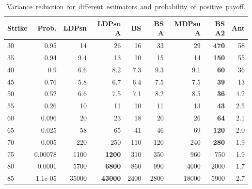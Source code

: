 \small{
\begin{table}[hbt!]
\centering
\begin{tabular}{lrrrrrrrr}
\toprule
Strike &   Prob. &  LDPsn &  LDPsn A &   BS &  BS A &  MDPsn A &  BS A2 &  Ant \\
\midrule
30 &    0.95 &     14 &       26 &   16 &    33 &           29  &    \textbf{470} &   58 \\
35 &    0.94 &    9.4 &       13 &   10 &    15 &           14  &    \textbf{150} &   55 \\
40 &     0.9 &    6.6 &      8.2 &  7.3 &   9.3 &          9.1  &     \textbf{60} &   36 \\
45 &    0.76 &    5.8 &      6.7 &  6.4 &   7.5 &          7.5  &     \textbf{39} &   13 \\
50 &    0.52 &    6.6 &      7.5 &  7.1 &   8.2 &          8.5  &     \textbf{36} &  4.2 \\
55 &    0.26 &     10 &       11 &   10 &    11 &           13  &     \textbf{43} &  2.5 \\
60 &   0.096 &     20 &       23 &   18 &    20 &           26  &     \textbf{64} &  2.1 \\
65 &   0.025 &     58 &       65 &   41 &    46 &           69  &    \textbf{120} &  2.0 \\
70 &   0.005 &    220 &      250 &  110 &   120 &          240  &    \textbf{280} &  1.9 \\
75 & 0.00078 &   1100 &     \textbf{1200} &  310 &   350 &          960 &    750 &  1.9 \\
80 &  0.0001 &   5700 &     \textbf{6800} &  860 &   990 &         4000 &   2000 &  1.7 \\
85 & 1.1e-05 &  35000 &    \textbf{43000} & 2400 &  2800 &        18000 &   5900 &  2.7 \\
\bottomrule
\end{tabular}
\bigskip
\caption{\mbox{Variance reduction for different estimators and probability of positive payoff.}}\label{tab:VarRedu}
\end{table}
}

